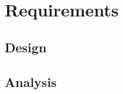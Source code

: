 \chapter{Requirements}\label{chap:requirements}

\section{Design}

\lipsum[10-20]
\blindenumerate[12]

\section{Analysis}

\lipsum[17-29]
